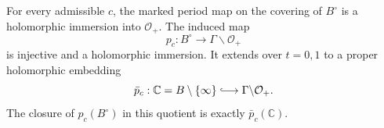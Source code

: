 \begin{theorem}\hypertarget{tag-01RE}{}\label{fam:src:F.3.1}\label{fam:st:F.3.1}

For every admissible $c$, the marked period map on the covering of
$B^\circ$ is a holomorphic immersion into $\mathcal O_+$.  The induced
map
\[
 p_c:B^\circ\longrightarrow\Gamma\backslash\mathcal O_+
\]
is injective and a holomorphic immersion.  It extends over $t=0,1$ to a
proper holomorphic embedding
\[
 \bar p_c:\mathbb C=B\setminus\{\infty\}
 \lhook\joinrel\longrightarrow\Gamma\backslash\mathcal O_+.
\]
The closure of $p_c(B^\circ)$ in this quotient is exactly
$\bar p_c(\mathbb C)$.
\end{theorem}



